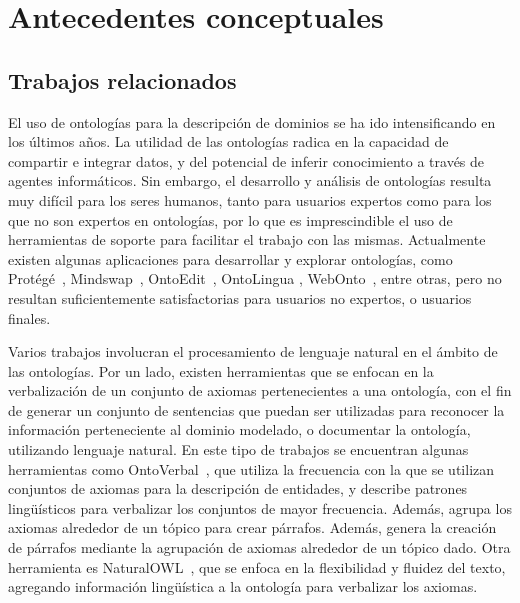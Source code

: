 \chapter{Antecedentes conceptuales}

\section{Trabajos relacionados}

El uso de ontologías para la descripción de dominios se ha ido intensificando en los últimos años. La utilidad de las ontologías radica en la capacidad de compartir e integrar datos, y del potencial de inferir conocimiento a través de agentes informáticos. Sin embargo, el desarrollo y análisis de ontologías resulta muy difícil para los seres humanos, tanto para usuarios expertos como para los que no son expertos en ontologías, por lo que es imprescindible el uso de herramientas de soporte para facilitar el trabajo con las mismas. Actualmente existen algunas aplicaciones para desarrollar y explorar ontologías, como Protégé~\cite{protege}, Mindswap~\cite{golbeck2002new}, OntoEdit~\cite{sure2002ontoedit}, OntoLingua \cite{farquhar1997ontolingua}, WebOnto~\cite{domingue1998tadzebao}, entre otras, pero no resultan suficientemente satisfactorias para usuarios no expertos, o usuarios finales. 

Varios trabajos involucran el procesamiento de lenguaje natural en el ámbito de las ontologías. Por un lado, existen herramientas que se enfocan en la verbalización de un conjunto de axiomas pertenecientes a una ontología, con el fin de generar un conjunto de sentencias que puedan ser utilizadas para reconocer la información perteneciente al dominio modelado, o documentar la ontología, utilizando lenguaje natural. En este tipo de trabajos se encuentran algunas herramientas como OntoVerbal~\cite{liang2013ontoverbal}, que utiliza la frecuencia con la que se utilizan conjuntos de axiomas para la descripción de entidades, y describe patrones lingüísticos para verbalizar los conjuntos de mayor frecuencia. Además, agrupa los axiomas alrededor de un tópico para crear párrafos. 
Además, genera la creación de párrafos mediante la agrupación de axiomas alrededor de un tópico dado.
Otra herramienta es NaturalOWL~\cite{galanis2007generating}, que se enfoca en la flexibilidad y fluidez del texto, agregando información lingüística a la ontología para verbalizar los axiomas.

